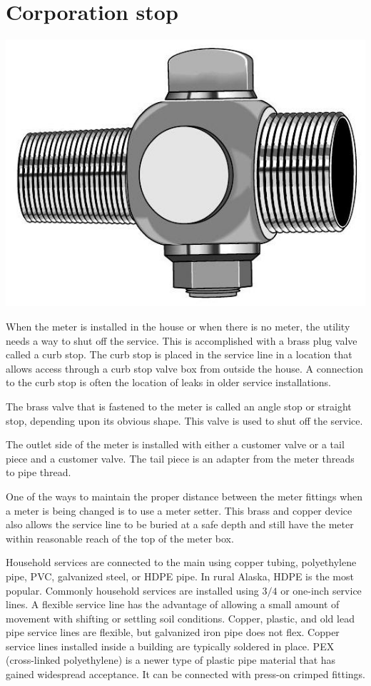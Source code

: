 \documentclass[10pt]{article}
\begin{document}
\section{Corporation stop}
\includegraphics[max width=\textwidth]{CorporationStop}

When the meter is installed in the house or when there is no meter, the utility needs a way to shut off the service. This is accomplished with a brass plug valve called a curb stop. The curb stop is placed in the service line in a location that allows access through a curb stop valve box from outside the house. A connection to the curb stop is often the location of leaks in older service installations.

The brass valve that is fastened to the meter is called an angle stop or straight stop, depending upon its obvious shape. This valve is used to shut off the service.

The outlet side of the meter is installed with either a customer valve or a tail piece and a customer valve. The tail piece is an adapter from the meter threads to pipe thread.

One of the ways to maintain the proper distance between the meter fittings when a meter is being changed is to use a meter setter. This brass and copper device also allows the service line to be buried at a safe depth and still have the meter within reasonable reach of the top of the meter box.

Household services are connected to the main using copper tubing, polyethylene pipe, PVC, galvanized steel, or HDPE pipe. In rural Alaska, HDPE is the most popular. Commonly household services are installed using $3 / 4$ or one-inch service lines. A flexible service line has the advantage of allowing a small amount of movement with shifting or settling soil conditions. Copper, plastic, and old lead pipe service lines are flexible, but galvanized iron pipe does not flex. Copper service lines installed inside a building are typically soldered in place. PEX (cross-linked polyethylene) is a newer type of plastic pipe material that has gained widespread acceptance. It can be connected with press-on crimped fittings.
\end{document}
